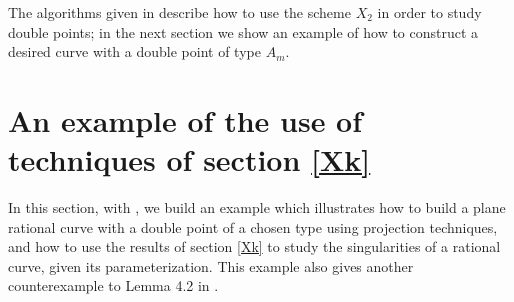 \documentclass[draft]{amsart}
\theoremstyle{definition}
\theoremstyle{remark}
\theoremstyle{definition}
\def\a{\bigskip \par \noindent}
\begin{document}
\a The algorithms given in \cite{BGI} describe how to use the scheme $X_2$ in order to study double points; in the next section we show an example of how to construct a desired curve with a double point of type $A_m$.

\a 
\section{An example of the use of techniques of section \ref{Xk}}

 \a In this section, with \cite{CoCoA}, we build an example  which illustrates how to build a plane rational curve with a double point of a chosen type using projection techniques, and how to use the results of section \ref{Xk} to study the singularities of a rational curve, given its parameterization. This example also gives another counterexample to  Lemma 4.2 in  \cite{BGI}.
\end{document}
